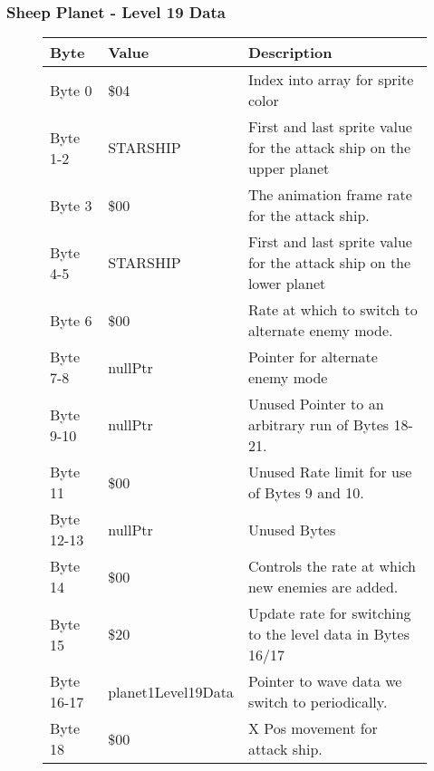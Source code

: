 \clearpage
\subsubsection{Sheep Planet - Level 19 Data}

\begin{figure}[H]
  {
  \setlength{\tabcolsep}{3.0pt}
  \setlength\cmidrulewidth{\heavyrulewidth} %
  \begin{adjustbox}{width=12cm}

\begin{tabular}{lll}
\toprule
 Byte       & Value              & Description                                                         \\
\midrule
 Byte 0     & \$04                & Index into array for sprite color                                   \\
 Byte 1-2   & STARSHIP           & First and last sprite value for the attack ship on the upper planet \\
 Byte 3     & \$00                & The animation frame rate for the attack ship.                       \\
 Byte 4-5   & STARSHIP           & First and last sprite value for the attack ship on the lower planet \\
 Byte 6     & \$00                & Rate at which to switch to alternate enemy mode.                    \\
 Byte 7-8   & nullPtr            & Pointer for alternate enemy mode                                    \\
 Byte 9-10  & nullPtr            & Unused Pointer to an arbitrary run of Bytes 18-21.                  \\
 Byte 11    & \$00                & Unused Rate limit for use of Bytes 9 and 10.                        \\
 Byte 12-13 & nullPtr            & Unused Bytes                                                        \\
 Byte 14    & \$00                & Controls the rate at which new enemies are added.                   \\
 Byte 15    & \$20                & Update rate for switching to the level data in Bytes 16/17          \\
 Byte 16-17 & planet1Level19Data & Pointer to wave data we switch to periodically.                     \\
 Byte 18    & \$00                & X Pos movement for attack ship.                                     \\

\end{tabular}
\end{adjustbox}}
\end{figure}
